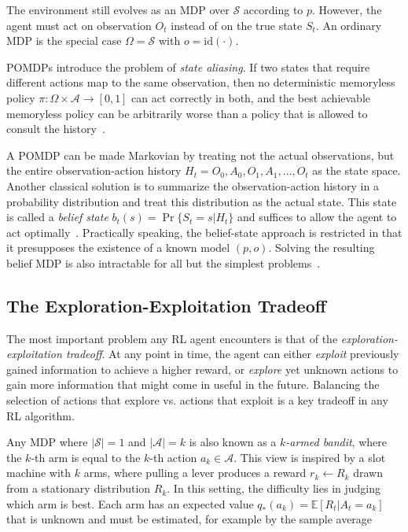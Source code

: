 The environment still evolves as an MDP over $\mathcal{S}$ according to $p$.
However, the agent must act on observation $O_t$ instead of on the true state $S_t$.
An ordinary MDP is the special case $\Omega=\mathcal{S}$ with $o=\text{id}(\cdot)$.

POMDPs introduce the problem of \emph{state aliasing}.
If two states that require different actions map to the same observation, then no deterministic
memoryless policy $\pi:\Omega\times\mathcal{A}\rightarrow[0,1]$ can act correctly in both,
and the best achievable memoryless policy can be arbitrarily worse than a policy that is
allowed to consult the history~\cite{SINGH1994284}.

A POMDP can be made Markovian by treating not the actual observations, but the
entire observation-action history $H_t=O_0,A_0,O_1,A_1,\dots,O_t$ as the state space.
Another classical solution is to summarize the observation-action history in a probability distribution 
and treat this distribution as the actual state.
This state is called a \emph{belief state} $b_t(s)=\Pr\{S_t=s|H_t\}$ and suffices
to allow the agent to act optimally~\cite{puterman_markov_2009}.
Practically speaking, the belief-state approach is restricted in that it presupposes
the existence of a known model $(p,o)$. Solving the resulting belief MDP is also intractable
for all but the simplest problems~\cite{papadimitriou_complexity_1987}.

\subsection{The Exploration-Exploitation Tradeoff}\label{sec:rl-exploration}

The most important problem any RL agent encounters is that of the \emph{exploration-exploitation tradeoff}.
At any point in time, the agent can either \emph{exploit} previously gained information
to achieve a higher reward, or \emph{explore} yet unknown actions to gain more information
that might come in useful in the future.
Balancing the selection of actions that explore vs. actions that exploit is a key tradeoff in any RL algorithm.

Any MDP where $\lvert\mathcal{S}\rvert=1$ and $\lvert\mathcal{A}\rvert=k$ is also known as
a \emph{$k$-armed bandit}, where the $k$-th arm is equal to the $k$-th action $a_k\in\mathcal{A}$.
This view is inspired by a slot machine with $k$ arms, where pulling a lever produces a reward $r_k\leftarrow R_k$
drawn from a stationary distribution $R_k$.
In this setting, the difficulty lies in judging which arm is best.
Each arm has an expected value $q_*(a_k)=\mathbb{E}[R_t|A_t=a_k]$ that is unknown
and must be estimated, for example by the sample average

